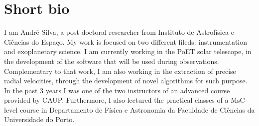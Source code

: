 \documentclass[11pt,a4paper,sans]{moderncv}
\begin{document}
\makecvtitle

\section{Short bio}

I am André Silva, a post-doctoral researcher from Instituto de Astrofísica e Ciências do Espaço. My work is focused on two different fileds: instrumentation and exoplanetary science. I am currently working in the PoET solar telescope, in the development of the software that will be used during observations. Complementary to that work, I am also working in the extraction of precise radial velocities, through the development of novel algorithms for such purpose. In the past 3 years I was one of the two instructors of an advanced course provided by CAUP. Furthermore, I also lectured the practical classes of a MsC-level course in Departamento de Física e Astronomia da Faculdade de Ciências da Universidade do Porto.











 
% 
\end{document}
